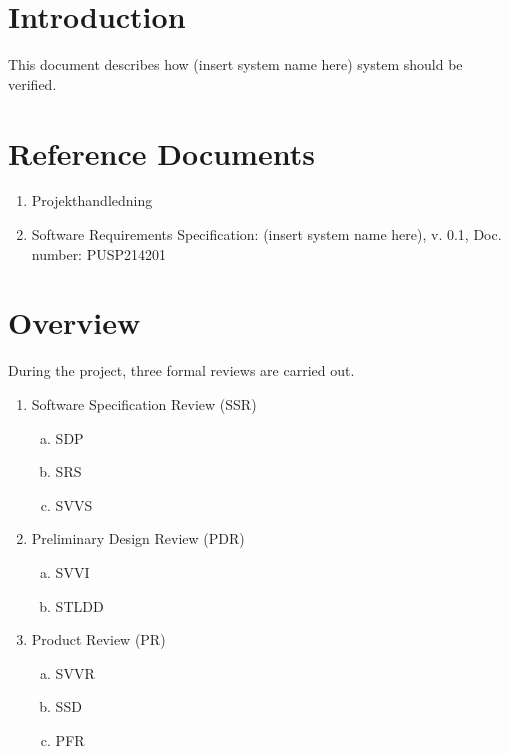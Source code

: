 \documentclass{article}
\date {#1}
\title {
    \documentNumber {02}    
    
    \documentVersion {0.1}
    
    \documentTitle {Software Verification and Validation Specification}
    \documentGroup {2}
    
    \documentResponsible {Test Group}
    \documentAuthors {Test Group}
    
    \documentDate {2021-02-01}
}
\begin{document}
\maketitle
\thispagestyle{empty}

\newpage

\tableofcontents

\newpage


\section{Introduction}

	This document describes how (insert system name here) system should be verified. 

\section{Reference Documents}

\begin{enumerate}
  \item Projekthandledning 
  \item Software Requirements Specification: (insert system name here), v. 0.1, Doc. number: PUSP214201
\end{enumerate}

\section{Overview}
During the project, three formal reviews are carried out.


\begin{enumerate}
	\item Software Specification Review (SSR)
		\begin{enumerate}[a.] 
			\item SDP
			\item SRS 
			\item SVVS 
		\end{enumerate}
	\item Preliminary Design Review (PDR) 
		\begin{enumerate}[a.]
			\item SVVI
			\item STLDD
		\end{enumerate}
	\item Product Review (PR) 
		\begin{enumerate}[a.]
			\item SVVR 
			\item SSD 
			\item PFR 
		\end{enumerate}
\end{enumerate}
\end{document}
